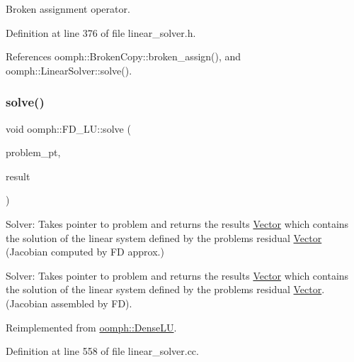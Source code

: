 Broken assignment operator. 



Definition at line 376 of file linear\+\_\+solver.\+h.



References oomph\+::\+Broken\+Copy\+::broken\+\_\+assign(), and oomph\+::\+Linear\+Solver\+::solve().

\mbox{\label{classoomph_1_1FD__LU_a6fd251bef9cdb7efbed4927f005eda2f}} 
\subsubsection{\texorpdfstring{solve()}{solve()}\hspace{0.1cm}{\footnotesize\ttfamily [1/3]}}
{\footnotesize\ttfamily void oomph\+::\+F\+D\+\_\+\+L\+U\+::solve (\begin{DoxyParamCaption}\item[{\hyperlink{classoomph_1_1Problem}{Problem} $\ast$const \&}]{problem\+\_\+pt,  }\item[{\hyperlink{classoomph_1_1DoubleVector}{Double\+Vector} \&}]{result }\end{DoxyParamCaption})\hspace{0.3cm}{\ttfamily [virtual]}}



Solver\+: Takes pointer to problem and returns the results \hyperlink{classoomph_1_1Vector}{Vector} which contains the solution of the linear system defined by the problem\textquotesingle{}s residual \hyperlink{classoomph_1_1Vector}{Vector} (Jacobian computed by FD approx.) 

Solver\+: Takes pointer to problem and returns the results \hyperlink{classoomph_1_1Vector}{Vector} which contains the solution of the linear system defined by the problem\textquotesingle{}s residual \hyperlink{classoomph_1_1Vector}{Vector}. (Jacobian assembled by FD). 

Reimplemented from \hyperlink{classoomph_1_1DenseLU_ac354b224819146618ce8a1396f8f980e}{oomph\+::\+Dense\+LU}.



Definition at line 558 of file linear\+\_\+solver.\+cc.




